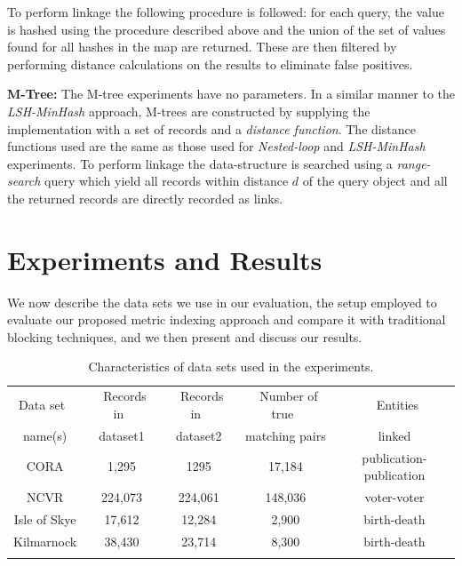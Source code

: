 \documentclass{llncs}
\begin{document}
To perform linkage the following procedure is followed: for each query, the value is hashed using the procedure described above and the union of the set of values found for all hashes in the map are returned. These are then filtered by performing distance calculations on the results to eliminate false positives.

\smallskip 
\textbf{M-Tree:} The M-tree experiments have no parameters. In a similar manner to the \emph{LSH-MinHash} approach, M-trees are constructed by supplying the implementation with a set of records and a \emph{distance function}. The distance functions used are the same as those used for \emph{Nested-loop} and \emph{LSH-MinHash} experiments. To perform linkage the data-structure is searched using a \emph{range-search} query which yield all records within distance $d$ of the query object and all the returned records are directly recorded as links.


\section{Experiments and Results}
\label{sec-exp}

We now describe the data sets we use in our evaluation, the setup
employed to evaluate our proposed metric indexing approach and
compare it with traditional blocking techniques, and we then present
and discuss our results.



\begin{table}[t]
\caption{Characteristics of data sets used in the experiments.}
 \label{table-datasets}
  \centering
  \begin{scriptsize}
  \begin{tabular}{ccccc}
  \hline\noalign{\smallskip}
  Data set~ & ~Records in~& ~Records in~ & ~Number of true~& ~Entities\\
  name(s)  & dataset1  & dataset2  & matching pairs & linked \\
  \noalign{\smallskip} \hline \noalign{\smallskip}
  CORA  & 1,295 & 1295 & 17,184 & publication-publication\\
  NCVR  & ~224,073~ & 224,061 & ~148,036~ & voter-voter\\
  Isle of Skye & 17,612 & 12,284& 2,900 & birth-death\\
  Kilmarnock  & 38,430 & 23,714 & 8,300 & birth-death\\
  \noalign{\smallskip} \hline
  \end{tabular}
  \end{scriptsize}
\end{table}
\end{document}
